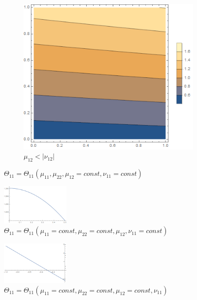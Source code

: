 \documentclass[12pt,a4]{article}
\begin{document}
\begin{figure}[!ht]
\begin{subfigure}[b]{0.3\textwidth}
	\end{subfigure}
	\hfill
	\begin{subfigure}[b]{0.3\textwidth}
		\centering
		\includegraphics[width=\textwidth]{Joonised/Theta11Mu11Mu22III}
		\caption{$ \mu_{12} < | \nu_{12}| $}
	\end{subfigure}
	\caption{$ \Theta_{11} = \Theta_{11} (\mu_{11}, \mu_{22}, \mu_{12} = const, \nu_{11} = const) $}
\end{figure}
\begin{figure}[!ht]
	\centering
	\includegraphics[width=0.3\textwidth]{Joonised/Theta11Mu12}
	\caption{$ \Theta_{11} = \Theta_{11} (\mu_{11} = const, \mu_{22} = const, \mu_{12}, \nu_{11} = const) $}
\end{figure}
\begin{figure}[!ht]
	\centering
	\includegraphics[width=0.3\textwidth]{Joonised/Theta11Nu11I}
	\caption{$ \Theta_{11} = \Theta_{11} (\mu_{11} = const, \mu_{22} = const, \mu_{12} = const, \nu_{11}) $}
\end{figure}
\end{document}
